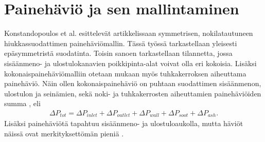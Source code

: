 \section{Painehäviö ja sen mallintaminen}
%     

Konstandopoulos et al. esittelevät artikkelissaan \cite{Konstandopoulos2000} symmetrisen, nokilatautuneen hiukkassuodattimen painehäviömallin. Tässä työssä tarkastellaan yleisesti epäsymmetristä suodatinta. Toisin sanoen tarkastellaan tilannetta, jossa sisäänmeno- ja ulostulokanavien poikkipinta-alat voivat olla eri kokoisia. Lisäksi kokonaispainehäviömalliin otetaan mukaan myös tuhkakerroksen aiheuttama painehäviö. Näin ollen kokonaispainehäviö on puhtaan suodattimen sisäänmenon, ulostulon ja seinämien, sekä noki- ja tuhkakerrosten aiheuttamien painehäviöiden summa \cite{Konstandopoulos2000}\cite{Konstandopoulos2008}, eli
\begin{align}
    \Delta P_{tot} = \Delta P_{inlet} +  \Delta P_{outlet} + \Delta P_{wall} + \Delta P_{soot} +  \Delta P_{ash}.
\end{align}
Lisäksi painehäviötä tapahtuu sisäänmeno- ja ulostuloaukolla, mutta häviöt näissä ovat merkityksettömän pieniä \cite{Konstandopoulos2000}.

